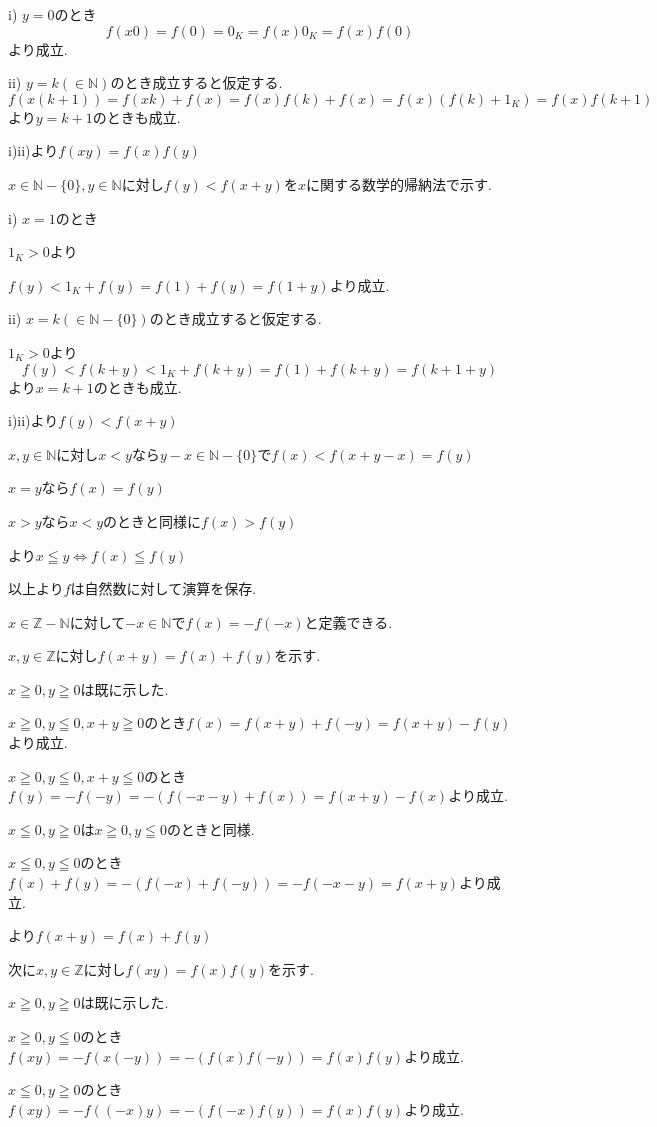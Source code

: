 \documentclass{jsarticle}
\begin{document}
i) $y=0$のとき
\[f(x0)=f(0)=0_K=f(x)0_K=f(x)f(0)\]
より成立.

ii) $y=k(\in\mathbb{N})$のとき成立すると仮定する.
\[f(x(k+1))=f(xk)+f(x)=f(x)f(k)+f(x)=f(x)(f(k)+1_K)=f(x)f(k+1)\]
より$y=k+1$のときも成立.

i)ii)より$f(xy)=f(x)f(y)$

$x\in\mathbb{N}-\{0\},y\in\mathbb{N}$に対し$f(y)< f(x+y)$を$x$に関する数学的帰納法で示す.

i) $x=1$のとき

$1_K > 0$より

$f(y)<1_K+f(y)=f(1)+f(y)=f(1+y)$より成立.

ii) $x=k(\in\mathbb{N}-\{0\})$のとき成立すると仮定する.

$1_K > 0$より
\[f(y) < f(k+y) < 1_K + f(k+y) = f(1) + f(k+y)  = f(k+1+y)\]
より$x=k+1$のときも成立.

i)ii)より$f(y) < f(x+y)$

$x,y\in\mathbb{N}$に対し$x < y$なら$y-x\in\mathbb{N}-\{0\}$で$f(x) < f(x+y-x) = f(y)$

$x=y$なら$f(x)=f(y)$

$x>y$なら$x<y$のときと同様に$f(x)>f(y)$

より$x\leqq y \Leftrightarrow f(x)\leqq f(y)$

以上より$f$は自然数に対して演算を保存.

$x\in \mathbb{Z}-\mathbb{N}$に対して$-x\in \mathbb{N}$で$f(x)=-f(-x)$と定義できる.

$x,y\in\mathbb{Z}$に対し$f(x+y)=f(x)+f(y)$を示す.

$x\geqq 0,y\geqq 0$は既に示した.

$x\geqq 0,y\leqq 0,x+y\geqq 0$のとき$f(x)=f(x+y)+f(-y)=f(x+y)-f(y)$より成立.

$x\geqq 0,y\leqq 0,x+y\leqq 0$のとき$f(y)=-f(-y)=-(f(-x-y)+f(x))=f(x+y)-f(x)$より成立.

$x\leqq 0,y\geqq 0$は$x\geqq 0,y\leqq 0$のときと同様.

$x\leqq 0,y\leqq 0$のとき$f(x)+f(y)=-(f(-x)+f(-y))=-f(-x-y)=f(x+y)$より成立.

より$f(x+y)=f(x)+f(y)$

次に$x,y\in\mathbb{Z}$に対し$f(xy)=f(x)f(y)$を示す.

$x\geqq 0,y\geqq 0$は既に示した.

$x\geqq 0,y\leqq 0$のとき$f(xy) = -f(x(-y))=-(f(x)f(-y))=f(x)f(y)$より成立.

$x\leqq 0,y\geqq 0$のとき$f(xy) = -f((-x)y)=-(f(-x)f(y))=f(x)f(y)$より成立.
\end{document}
